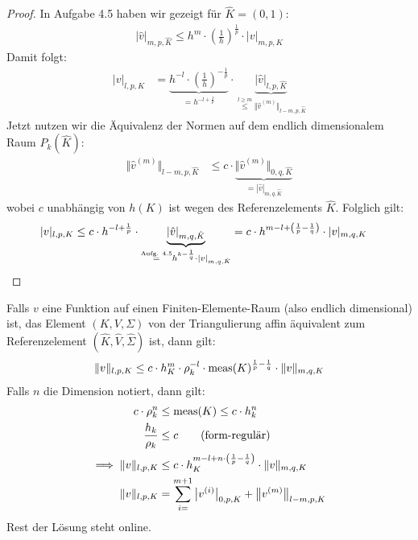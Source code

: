 \begin{proof}
	In Aufgabe 4.5 haben wir gezeigt für $\hat{K}=(0,1)$:
	\begin{align*}
		|\hat{v}|_{m,p,\hat{K}}\leq h^m\cdot\left(\frac{1}{h}\right)^{\frac{1}{p}}\cdot|v|_{m,p,K}
	\end{align*}
	Damit folgt:
	\begin{align*}
		|v|_{l,p,K}
		&=\underbrace{h^{-l}\cdot\left(\frac{1}{h}\right)^{-\frac{1}{p}}}_{=h^{-l+\frac{1}{p}}}\cdot\underbrace{|\hat{v}|_{l,p,\hat{K}}}_{\stackrel{l\geq m}{\leq}\Vert \hat{v}^{(m)}\Vert_{l-m,p,\hat{K}}}
	\end{align*}
	Jetzt nutzen wir die Äquivalenz der Normen auf dem endlich dimensionalem Raum $P_k(\hat{K})$:
	\begin{align*}
		\Vert \hat{v}^{(m)}\Vert_{l-m,p,\hat{K}}
		&\leq
		c\cdot\underbrace{\Vert\hat{v}^{(m)}\Vert_{0,q,\hat{K}}}_{=|\hat{v}|_{m,q,\hat{K}}}
	\end{align*}
	wobei $c$ unabhängig von $h(K)$ ist wegen des Referenzelements $\hat{K}$. Folglich gilt:
	\begin{align*}
		|v|_{l,p,K}
		&\leq
		c\cdot h^{-l+\frac{1}{p}}\cdot\underbrace{|\hat{v}|_{m,q,\hat{K}}}_{\stackrel{\text{Aufg. 4.5}}{=}h^{k-\frac{1}{q}}\cdot|v|_{m,q,\hat{K}}}
		=c\cdot h^{m-l+\left(\frac{1}{p}-\frac{1}{q}\right)}\cdot|v|_{m,q,K}
	\end{align*}
\end{proof}

\begin{bemerkung}
	Falls $v$ eine Funktion auf einen Finiten-Elemente-Raum (also endlich dimensional) ist, das Element $(K,V,\Sigma)$ von der Triangulierung affin äquivalent zum Referenzelement $(\hat{K},\hat{V},\hat{\Sigma})$ ist, dann gilt:
	\begin{align*}
		\Vert v\Vert_{l,p,K}\leq c\cdot h_K^m\cdot\rho_k^{-l}\cdot\operatorname{meas}(K)^{\frac{1}{p}-\frac{1}{q}}\cdot\Vert v\Vert_{m,q,K}
	\end{align*}
	Falls $n$ die Dimension notiert, dann gilt:
	\begin{align*}
		c\cdot \rho_k^n&\leq\operatorname{meas}(K)\leq c\cdot h_k^n\\
		\frac{h_k}{\rho_k}&\leq c\qquad\text{(form-regulär)}\\
		\implies\Vert v\Vert_{l,p,K}&\leq c\cdot h_K^{m-l+n\cdot\left(\frac{1}{p}-\frac{1}{q}\right)}\cdot\Vert v\Vert_{m,q,K}\\
		\Vert v\Vert_{l,p,K}&=\sum\limits_{i=}^{m+1}\big| v^{(i)}\big|_{0,p,K}+\big\Vert v^{(m)}\big\Vert_{l-m,p,K}
	\end{align*}
	Rest der Lösung steht online.
\end{bemerkung}

